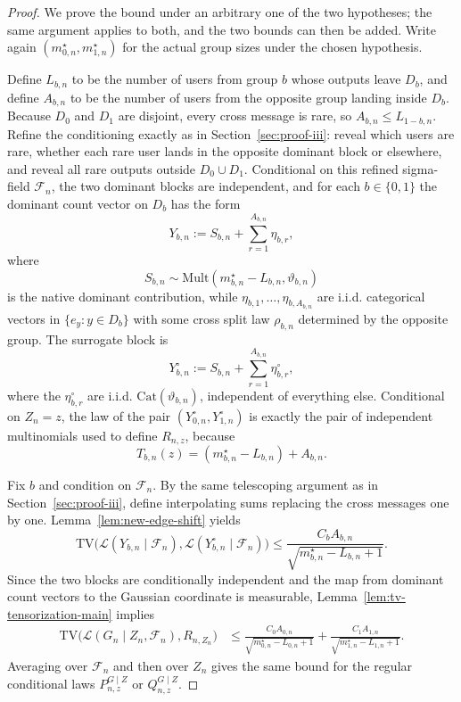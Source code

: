 \documentclass{article}
\newcommand{\TV}{\mathrm{TV}}
\newcommand{\Mult}{\mathrm{Mult}}
\newcommand{\Cat}{\mathrm{Cat}}
\newcommand{\1}{\mathbf 1}
\begin{document}
\begin{proof}
We prove the bound under an arbitrary one of the two hypotheses; the same argument applies to both, and the two
bounds can then be added. Write again $(m_{0,n}^\star,m_{1,n}^\star)$ for the actual group sizes under the chosen
hypothesis.

Define $L_{b,n}$ to be the number of users from group $b$ whose outputs leave $D_b$, and define $A_{b,n}$ to be the
number of users from the opposite group landing inside $D_b$. Because $D_0$ and $D_1$ are disjoint, every cross
message is rare, so $A_{b,n}\le L_{1-b,n}$. Refine the conditioning exactly as in Section~\ref{sec:proof-iii}: reveal
which users are rare, whether each rare user lands in the opposite dominant block or elsewhere, and reveal all rare
outputs outside $D_0\cup D_1$. Conditional on this refined sigma-field $\mathcal F_n$, the two dominant blocks are
independent, and for each $b\in\{0,1\}$ the dominant count vector on $D_b$ has the form
\[
Y_{b,n}:=S_{b,n}+\sum_{r=1}^{A_{b,n}}\eta_{b,r},
\]
where
\[
S_{b,n}\sim \Mult(m_{b,n}^\star-L_{b,n},\vartheta_{b,n})
\]
is the native dominant contribution, while $\eta_{b,1},\dots,\eta_{b,A_{b,n}}$ are i.i.d. categorical vectors in
$\{e_y:y\in D_b\}$ with some cross split law $\rho_{b,n}$ determined by the opposite group. The surrogate block is
\[
Y_{b,n}^\circ:=S_{b,n}+\sum_{r=1}^{A_{b,n}}\eta_{b,r}^\circ,
\]
where the $\eta_{b,r}^\circ$ are i.i.d. $\Cat(\vartheta_{b,n})$, independent of everything else. Conditional on
$Z_n=z$, the law of the pair $(Y_{0,n}^\circ,Y_{1,n}^\circ)$ is exactly the pair of independent multinomials used to
define $R_{n,z}$, because
\[
T_{b,n}(z)=(m_{b,n}^\star-L_{b,n})+A_{b,n}.
\]

Fix $b$ and condition on $\mathcal F_n$. By the same telescoping argument as in Section~\ref{sec:proof-iii}, define
interpolating sums replacing the cross messages one by one. Lemma~\ref{lem:new-edge-shift} yields
\[
\TV\bigl(\mathcal L(Y_{b,n}\mid \mathcal F_n),\mathcal L(Y_{b,n}^\circ\mid \mathcal F_n)\bigr)
\le \frac{C_bA_{b,n}}{\sqrt{m_{b,n}^\star-L_{b,n}+1}}.
\]
Since the two blocks are conditionally independent and the map from dominant count vectors to the Gaussian
coordinate is measurable, Lemma~\ref{lem:tv-tensorization-main} implies
\begin{align*}
\TV\bigl(\mathcal L(G_n\mid Z_n,\mathcal F_n),R_{n,Z_n}\bigr)
&\le \frac{C_0A_{0,n}}{\sqrt{m_{0,n}^\star-L_{0,n}+1}}
+\frac{C_1A_{1,n}}{\sqrt{m_{1,n}^\star-L_{1,n}+1}}.
\end{align*}
Averaging over $\mathcal F_n$ and then over $Z_n$ gives the same bound for the regular conditional laws
$P_{n,z}^{G\mid Z}$ or $Q_{n,z}^{G\mid Z}$.


\end{proof}
\end{document}
